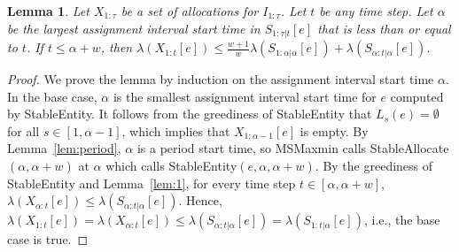 \documentclass[11pt,a4paper]{article}
\renewcommand{\leq}{\leqslant}
\newtheorem{lemma}[theorem]{\bfseries{Lemma}}
\begin{document}
\begin{lemma}
	\label{lem:2}
	Let $X_{1:\tau}$ be a set of allocations for $I_{1:\tau}$.  Let $t$ be any time step.   Let $\alpha$ be the largest assignment interval start time in $S_{1:\tau|t}[e]$ that is less than or equal to $t$.  If $t \leq \alpha+w$, then $\lambda(X_{1:t}[e]) \leq \frac{w+1}{w}\lambda(S_{1:\alpha|\alpha}[e]) + \lambda(S_{\alpha:t|\alpha}[e])$.
\end{lemma}
\begin{proof}
	We prove the lemma by induction on the assignment interval start time $\alpha$.  In the base case, $\alpha$ is the smallest assignment interval start time for $e$ computed by StableEntity.  It follows from the greediness of StableEntity that $L_s(e) = \emptyset$ for all $s \in [1,\alpha-1]$, which implies that $X_{1:\alpha-1}[e]$ is empty.  By Lemma~\ref{lem:period}, $\alpha$ is a period start time, so MSMaxmin calls StableAllocate$(\alpha,\alpha+w)$ at $\alpha$ which calls StableEntity$(e,\alpha,\alpha+w)$.  By the greediness of StableEntity and Lemma~\ref{lem:1}, for every time step $t \in [\alpha,\alpha+w]$, $\lambda(X_{\alpha:t}[e]) \leq \lambda(S_{\alpha:t|\alpha}[e])$.  Hence, $\lambda(X_{1:t}[e]) = \lambda(X_{\alpha:t}[e]) \leq \lambda(S_{\alpha:t|\alpha}[e]) =\lambda(S_{1:t|\alpha}[e])$, i.e., the base case is true.
	

\end{proof}
\end{document}

